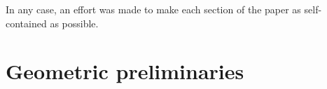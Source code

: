 \documentclass[11pt,english]{article}
\numberwithin{equation}{section}
\theoremstyle{remark}
\theoremstyle{plain}
\theoremstyle{remark}
\renewcommand{\(}{\left(}
\renewcommand{\)}{\right)}
\begin{document}
In any case, an effort was made to make each section of the paper as self-contained as possible.
%
%







\section{Geometric preliminaries}\label{sec:geom}
\end{document}
